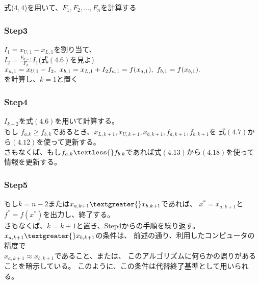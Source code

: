 式($4,4$)を用いて、$F_1, F_2, \dots ,
F_n$を計算する

\subsubsection*{Step3}\label{step3}

$I_1 = x_{U,1} -x_{L,1}$を割り当て、 \\
$I_2 = \frac{F_{n-1}}{F_n} I_1$(式$(4.6)$を見よ) \\
$
x_{a,1} = x_{U,1} - I_2, \ x_{b,1} = x_{L,1} + I_2 \\
f_{a,1} = f(x_{a,1}), \ f_{b,1} = f(x_{b,1}).
$ \\
を計算し、$k = 1$と置く

\subsubsection*{Step4}\label{step4}

$I_{k+2}$を式$(4.6)$を用いて計算する。 \\
もし $f_{a.k} \geq
f_{b,k}$であるとき、$x_{L,k+1},x_{U,k+1},x_{b,k+1},f_{a,k+1},f_{b,k+1}$を
式$(4.7)$から$(4.12)$を使って更新する。 \\
さもなくば、もし$f_{a,k} \textless{}
f_{b.k}$であれば式$(4.13)$から$(4.18)$を使って情報を更新する。

\subsubsection*{Step5}\label{step5}

もし$k = n - 2$または$x_{a,k+1} \textgreater{}
x_{b,k+1}$であれば、 $x^\ast =
x_{a,k+1}$と$f^\ast =
f(x^\ast)$を出力し、終了する。 \\
さもなくば、$k = k + 1$と置き、Step4からの手順を繰り返す。 \\
$x_{a,k+1} \textgreater{} x_{b,k+1}$の条件は、
前述の通り、利用したコンピュータの精度で \\
$x_{a,k+1} \approx x_{b,k+1}$であること、または、
このアルゴリズムに何らかの誤りがあることを暗示している。
このように、この条件は代替終了基準として用いられる。
